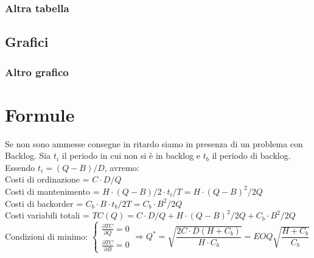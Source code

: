 \documentclass{FR16}
\begin{document}
\subsubsection{Altra tabella}
\subsection{Grafici}
\begin{center}

\end{center}

\subsubsection{Altro grafico}
\newpage

\section{Formule}
Se non sono ammesse consegne in ritardo siamo in presenza di un problema con Backlog. Sia $ t_{i} $ il periodo in cui non si è in backlog e $ t_{b} $ il periodo di backlog. Essendo $ t_{i}=(Q-B)/D $, avremo:\\
Costi di ordinazione = $C\cdot D/Q$\\
Costi di mantenimento = $ H\cdot (Q-B)/2\cdot t_{i}/T=H\cdot (Q-B)^{2}/2Q $\\
Costi di backorder = $ C_{b}\cdot B\cdot t_{b}/2T=C_{b}\cdot B^{2}/2Q $\\
Costi variabili totali = $ TC(Q)=C\cdot D/Q+H\cdot (Q-B)^{2}/2Q+C_{b}\cdot B^{2}/2Q $\\
Condizioni di minimo: 
$\begin{cases}
\frac{\partial TC}{\partial Q}=0\\\frac{\partial TC}{\partial B}=0
\end{cases}
\Rightarrow
Q^{\ast}=\sqrt{\dfrac{2C\cdot D(H+C_{b})}{H\cdot C_{b}}}=EOQ\sqrt{\dfrac{H+C_{b}}{C_{b}}}
$
\end{document}
